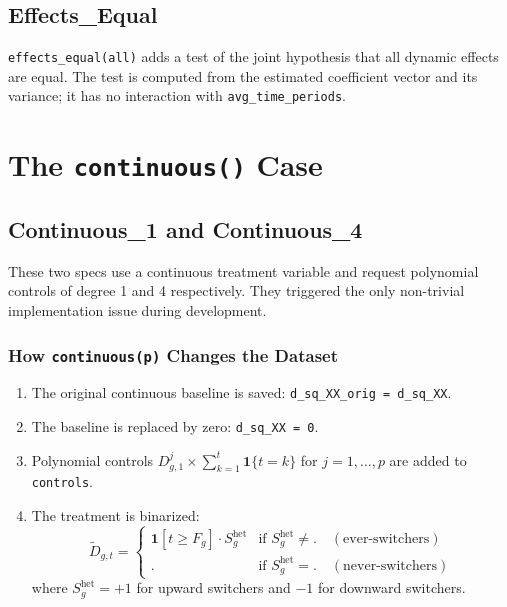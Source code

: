 \documentclass[11pt]{article}
\begin{document}
\subsection{Effects\_Equal}

\texttt{effects\_equal(all)} adds a test of the joint hypothesis that all
dynamic effects are equal. The test is computed from the estimated coefficient
vector and its variance; it has no interaction with \texttt{avg\_time\_periods}.

\section{The \texttt{continuous()} Case}

\subsection{Continuous\_1 and Continuous\_4}

These two specs use a continuous treatment variable and request polynomial
controls of degree 1 and 4 respectively. They triggered the only
non-trivial implementation issue during development.

\subsubsection{How \texttt{continuous(p)} Changes the Dataset}

\begin{enumerate}[nosep]
  \item The original continuous baseline is saved: \texttt{d\_sq\_XX\_orig = d\_sq\_XX}.
  \item The baseline is replaced by zero: \texttt{d\_sq\_XX = 0}.
  \item Polynomial controls $D_{g,1}^j \times \sum_{k=1}^{t} \mathbf{1}\{t=k\}$
        for $j = 1,\dots,p$ are added to \texttt{controls}.
  \item The treatment is binarized:
        \[
          \tilde{D}_{g,t} =
          \begin{cases}
            \mathbf{1}[t \geq F_g] \cdot S_g^{\text{het}} & \text{if } S_g^{\text{het}} \neq \texttt{.}
                                                               \quad(\text{ever-switchers})\\
            \texttt{.} & \text{if } S_g^{\text{het}} = \texttt{.}
                          \quad(\text{never-switchers})
          \end{cases}
        \]
        where $S_g^{\text{het}} = +1$ for upward switchers and $-1$ for
        downward switchers.
\end{enumerate}
\end{document}
